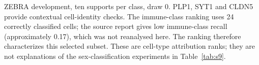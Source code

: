 ZEBRA development, ten supports per class, draw 0. PLP1, SYT1 and CLDN5 provide contextual cell-identity checks\citep{gong2025stereoseq}. The immune-class ranking uses 24 correctly classified cells; the source report gives low immune-class recall (approximately 0.17), which was not reanalysed here. The ranking therefore characterizes this selected subset. These are cell-type attribution ranks; they are not explanations of the sex-classification experiments in Table~\ref{tab:s9}.